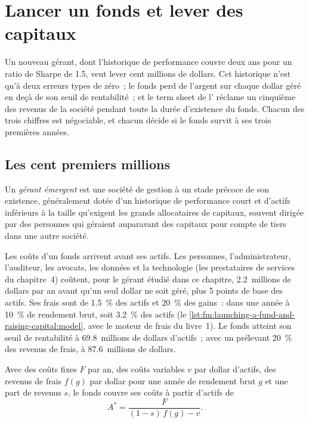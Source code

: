 \chapter{Lancer un fonds et lever des capitaux}\label{ch:fm:launching-a-fund-and-raising-capital}

Un nouveau gérant, dont l'historique de performance couvre deux ans pour un ratio de Sharpe de 1.5, veut lever cent millions de dollars. Cet historique n'est qu'à deux erreurs types
de zéro~; le fonds perd de l'argent sur chaque dollar géré en deçà de son seuil de rentabilité~; et le term sheet de l' réclame un cinquième des revenus de la société pendant
toute la durée d'existence du fonds. Chacun des trois chiffres est négociable, et chacun décide si le fonds survit à ses trois premières années.

\section{Les cent premiers millions}

\begin{definition}\label{def:fm:launching-a-fund-and-raising-capital:emerging}
Un \emph{gérant émergent} est une société de gestion à un stade précoce de son existence, généralement dotée d'un historique de performance court et d'actifs inférieurs
à la taille qu'exigent les grands allocataires de capitaux, souvent dirigée par des personnes qui géraient auparavant des capitaux pour compte de tiers dans une autre société.
\end{definition}

Les coûts d'un fonds arrivent avant ses actifs. Les personnes, l'administrateur, l'auditeur, les avocats, les données et la technologie (les prestataires de services du chapitre~4) coûtent,
pour le gérant étudié dans ce chapitre, 2.2~millions de dollars par an avant qu'un seul dollar ne soit géré, plus 5 points de base des actifs. Ses frais sont de 1.5~\% des actifs et 20~\% des gains~:
dans une année à 10~\% de rendement brut, soit 3.2~\% des actifs (le \cref{lst:fm:launching-a-fund-and-raising-capital:model}, avec le moteur de frais du livre~1). Le fonds atteint son seuil de rentabilité à
69.8~millions de dollars d'actifs~; avec un  prélevant 20~\% des revenus de frais, à 87.6~millions de dollars.

\begin{proposition}\label{prop:fm:launching-a-fund-and-raising-capital:be}
Avec des coûts fixes $F$ par an, des coûts variables $v$ par dollar d'actifs, des revenus de frais $f(g)$ par dollar pour une année de rendement brut $g$ et une part de revenus
$s$, le fonds couvre ses coûts à partir d'actifs de
\[
A^*=\frac{F}{(1-s)\,f(g)-v}.
\]
\end{proposition}


